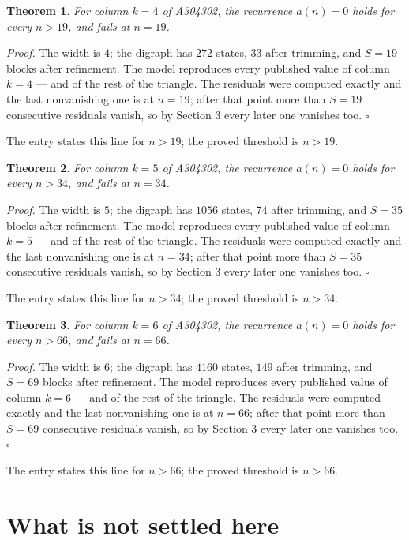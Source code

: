 \documentclass[11pt]{article}
\newtheorem{theorem}{Theorem}
\theoremstyle{definition}
\begin{document}
\begin{theorem} For column $k = 4$ of A304302, the recurrence $a(n) = 0$ holds for every $n > 19$, and fails at $n = 19$.\end{theorem}

{\itshape Proof.} The width is $4$; the digraph has $272$ states, $33$ after trimming, and $S = 19$ blocks after refinement. The model reproduces every published value of column $k = 4$ --- and of the rest of the triangle. The residuals were computed exactly and the last nonvanishing one is at $n = 19$; after that point more than $S = 19$ consecutive residuals vanish, so by Section 3 every later one vanishes too. $\square$

The entry states this line for $n > 19$; the proved threshold is $n > 19$.

\begin{theorem} For column $k = 5$ of A304302, the recurrence $a(n) = 0$ holds for every $n > 34$, and fails at $n = 34$.\end{theorem}

{\itshape Proof.} The width is $5$; the digraph has $1056$ states, $74$ after trimming, and $S = 35$ blocks after refinement. The model reproduces every published value of column $k = 5$ --- and of the rest of the triangle. The residuals were computed exactly and the last nonvanishing one is at $n = 34$; after that point more than $S = 35$ consecutive residuals vanish, so by Section 3 every later one vanishes too. $\square$

The entry states this line for $n > 34$; the proved threshold is $n > 34$.

\begin{theorem} For column $k = 6$ of A304302, the recurrence $a(n) = 0$ holds for every $n > 66$, and fails at $n = 66$.\end{theorem}

{\itshape Proof.} The width is $6$; the digraph has $4160$ states, $149$ after trimming, and $S = 69$ blocks after refinement. The model reproduces every published value of column $k = 6$ --- and of the rest of the triangle. The residuals were computed exactly and the last nonvanishing one is at $n = 66$; after that point more than $S = 69$ consecutive residuals vanish, so by Section 3 every later one vanishes too. $\square$

The entry states this line for $n > 66$; the proved threshold is $n > 66$.

\section{What is not settled here}
\end{document}
